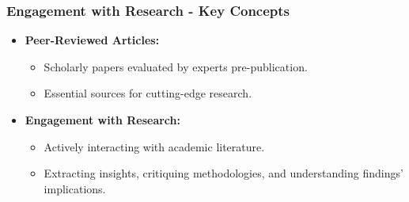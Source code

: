 \documentclass[aspectratio=169]{beamer}
\begin{document}
\begin{frame}[fragile]
    \frametitle{Engagement with Research - Key Concepts}
    \begin{itemize}
        \item \textbf{Peer-Reviewed Articles:}
          \begin{itemize}
              \item Scholarly papers evaluated by experts pre-publication.
              \item Essential sources for cutting-edge research.
          \end{itemize}
        \item \textbf{Engagement with Research:}
          \begin{itemize}
              \item Actively interacting with academic literature.
              \item Extracting insights, critiquing methodologies, and understanding findings' implications.
          \end{itemize}
    \end{itemize}
\end{frame}
\end{document}
